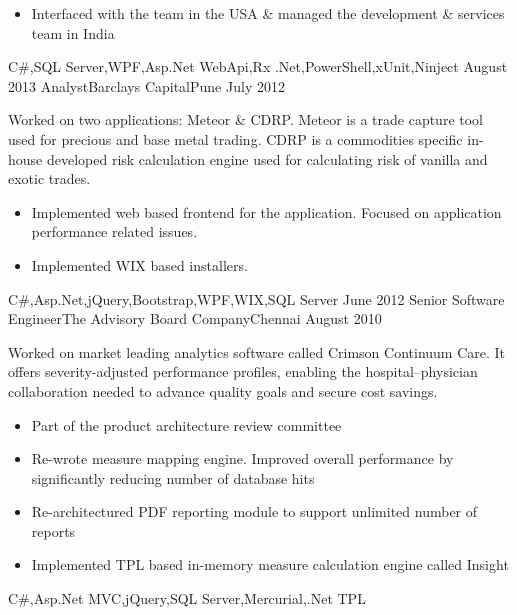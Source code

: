 \begin{experiences}
{\begin{itemize}
                        \item Interfaced with the team in the USA \& managed the development \& services team in India\\
                      \end{itemize}
                    }
                    {C\#,SQL Server,WPF,Asp.Net WebApi,Rx .Net,PowerShell,xUnit,Ninject}
  \emptySeparator
  \experience
  {August 2013}     {Analyst}{Barclays Capital}{Pune}
  {July 2012}   	{
  					  Worked on two applications: Meteor \& CDRP. Meteor is a trade capture tool used for precious and base metal trading. CDRP is a commodities specific in-house
  					  developed risk calculation engine used for calculating risk of vanilla and exotic trades.
                      \begin{itemize}
                        \item Implemented web based frontend for the application. Focused on application performance related issues.
                        \item Implemented WIX based installers.\\
                      \end{itemize}
                    }
                    {C\#,Asp.Net,jQuery,Bootstrap,WPF,WIX,SQL Server}
  \emptySeparator         
  \experience
  {June 2012}  {Senior Software Engineer}{The Advisory Board Company}{Chennai}
  {August 2010}   {
                      Worked on market leading analytics software called Crimson Continuum Care. It offers severity-adjusted performance profiles, enabling the hospital–physician collaboration needed to advance quality goals and secure cost savings.  
                      \begin{itemize}
                        \item Part of the product architecture review committee
                        \item Re-wrote measure mapping engine. Improved overall performance by significantly reducing number of database hits
                        \item Re-architectured PDF reporting module to support unlimited number of reports
                        \item Implemented TPL based in-memory measure calculation engine called Insight\\  
                      \end{itemize}
                  }
                  {C\#,Asp.Net MVC,jQuery,SQL Server,Mercurial,.Net TPL} 

\end{experiences}
